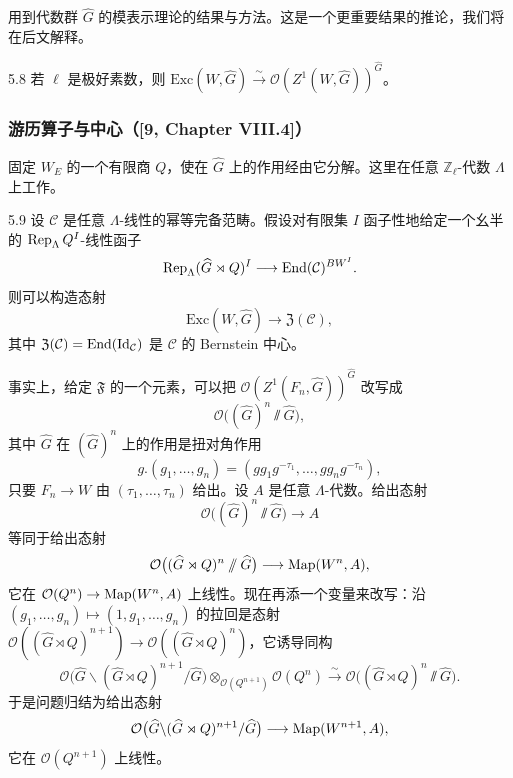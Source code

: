 用到代数群 $\widehat{G}$ 的模表示理论的结果与方法。这是一个更重要结果的推论，我们将在后文解释。

\begin{thm}{5.8}
若 $\ell$ 是极好素数，则 $\mathrm{Exc}(W,\widehat{G})\xrightarrow{\ \sim\ }\mathcal{O}(Z^{1}(W,\widehat{G}))^{\widehat{G}}$。
\label{thm:a3-5-8}
\end{thm}

\subsubsection{游历算子与中心（[9, Chapter VIII.4]）}
固定 $W_{E}$ 的一个有限商 $Q$，使在 $\widehat{G}$ 上的作用经由它分解。这里在任意 $\mathbb{Z}_{\ell}$-代数 $\Lambda$ 上工作。

\begin{thm}{5.9}
设 $\mathcal{C}$ 是任意 $\Lambda$-线性的幂等完备范畴。假设对有限集 $I$ 函子性地给定一个幺半的 $\operatorname{Rep}_{\Lambda}Q^{I}$-线性函子
\[
\operatorname{Rep}_{\Lambda}(\widehat{G}\rtimes Q)^{I}\longrightarrow\operatorname{End}(\mathcal{C})^{BW^{I}}.
\]
则可以构造态射
\[
\mathrm{Exc}(W,\widehat{G})\longrightarrow\mathfrak{Z}(\mathcal{C}),
\]
其中 $\mathfrak{Z}(\mathcal{C})=\operatorname{End}(\mathrm{Id}_{\mathcal{C}})$ 是 $\mathcal{C}$ 的 Bernstein 中心。
\label{thm:a3-5-9}
\end{thm}

事实上，给定 $\mathfrak{F}$ 的一个元素，可以把 $\mathcal{O}(Z^{1}(F_{n},\widehat{G}))^{\widehat{G}}$ 改写成
\[
\mathcal{O}\bigl((\widehat{G})^{n}\sslash\widehat{G}\bigr),
\]
其中 $\widehat{G}$ 在 $(\widehat{G})^{n}$ 上的作用是扭对角作用
\[
g.(g_{1},\dots,g_{n})=(gg_{1}g^{-\tau_{1}},\dots,gg_{n}g^{-\tau_{n}}),
\]
只要 $F_{n}\to W$ 由 $(\tau_{1},\dots,\tau_{n})$ 给出。设 $A$ 是任意 $\Lambda$-代数。给出态射
\[
\mathcal{O}\bigl((\widehat{G})^{n}\sslash\widehat{G}\bigr)\longrightarrow A
\]
等同于给出态射
\[
\mathcal{O}\bigl((\widehat{G}\rtimes Q)^{n}\sslash\widehat{G}\bigr)\longrightarrow\operatorname{Map}(W^{n},A),
\]
它在 $\mathcal{O}(Q^{n})\to\operatorname{Map}(W^{n},A)$ 上线性。现在再添一个变量来改写：沿 $(g_{1},\dots,g_{n})\mapsto(1,g_{1},\dots,g_{n})$ 的拉回是态射 $\mathcal{O}((\widehat{G}\rtimes Q)^{n+1})\to\mathcal{O}((\widehat{G}\rtimes Q)^{n})$，它诱导同构
\[
\mathcal{O}\bigl(\widehat{G}\backslash(\widehat{G}\rtimes Q)^{n+1}/\widehat{G}\bigr)\otimes_{\mathcal{O}(Q^{n+1})}\mathcal{O}(Q^{n})\xrightarrow{\ \sim\ }\mathcal{O}\bigl((\widehat{G}\rtimes Q)^{n}\sslash\widehat{G}\bigr).
\]
于是问题归结为给出态射
\[
\mathcal{O}\bigl(\widehat{G}\backslash(\widehat{G}\rtimes Q)^{n+1}/\widehat{G}\bigr)\longrightarrow\operatorname{Map}(W^{n+1},A),
\]
它在 $\mathcal{O}(Q^{n+1})$ 上线性。

